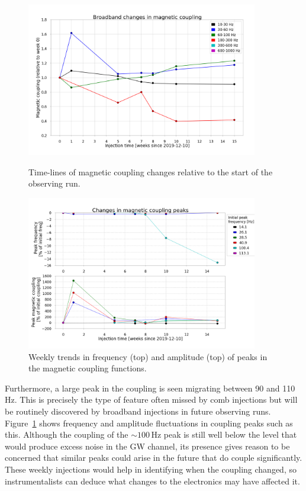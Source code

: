 \begin{figure}
	\centering
	\includegraphics[width=0.9\textwidth]{figures/noise-studies/mag-weekly-bands.png}
	\caption{Time-lines of magnetic coupling changes relative to the start of the observing run.}
	\label{fig:mag-weekly-bands}
	\includegraphics[width=0.9\textwidth]{figures/noise-studies/mag-weekly-peaks.png}
	\caption{Weekly trends in frequency (top) and amplitude (top) of peaks in the magnetic coupling functions.}
	\label{fig:mag-weekly-peaks}
\end{figure}

Furthermore, a large peak in the coupling is seen migrating between 90 and 110 Hz.
This is precisely the type of feature often missed by comb injections but will be routinely discovered by broadband injections in future observing runs.
Figure~\ref{fig:mag-weekly-peaks} shows frequency and amplitude fluctuations in coupling peaks such as this.
Although the coupling of the $\sim100$\,Hz peak is still well below the level that would produce excess noise in the \ac{GW} channel, its presence gives reason to be concerned that similar peaks could arise in the future that do couple significantly.
These weekly injections would help in identifying when the coupling changed, so instrumentalists can deduce what changes to the electronics may have affected it.

